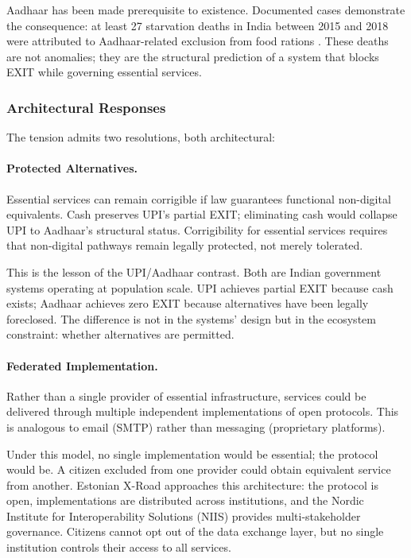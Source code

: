 Aadhaar has been made prerequisite to existence. Documented cases demonstrate the consequence: at least 27 starvation deaths in India between 2015 and 2018 were attributed to Aadhaar-related exclusion from food rations \citep{khera2017}. These deaths are not anomalies; they are the structural prediction of a system that blocks EXIT while governing essential services.

\subsubsection{Architectural Responses}

The tension admits two resolutions, both architectural:

\paragraph{Protected Alternatives.} Essential services can remain corrigible if law guarantees functional non-digital equivalents. Cash preserves UPI's partial EXIT; eliminating cash would collapse UPI to Aadhaar's structural status. Corrigibility for essential services requires that non-digital pathways remain legally protected, not merely tolerated.

This is the lesson of the UPI/Aadhaar contrast. Both are Indian government systems operating at population scale. UPI achieves partial EXIT because cash exists; Aadhaar achieves zero EXIT because alternatives have been legally foreclosed. The difference is not in the systems' design but in the ecosystem constraint: whether alternatives are permitted.

\paragraph{Federated Implementation.} Rather than a single provider of essential infrastructure, services could be delivered through multiple independent implementations of open protocols. This is analogous to email (SMTP) rather than messaging (proprietary platforms).

Under this model, no single implementation would be essential; the protocol would be. A citizen excluded from one provider could obtain equivalent service from another. Estonian X-Road approaches this architecture: the protocol is open, implementations are distributed across institutions, and the Nordic Institute for Interoperability Solutions (NIIS) provides multi-stakeholder governance. Citizens cannot opt out of the data exchange layer, but no single institution controls their access to all services.

